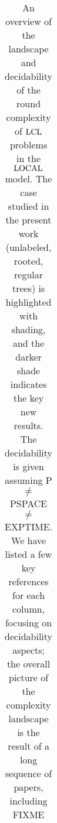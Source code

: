 \begin{table}
\begin{adjustbox}{center}
\begin{tabular}{@{}ll@{\hsp}c@{\hs}c@{\hs}c@{\hs}c@{\hsp}c@{\hs}c@{\hs}c@{\hs}c@{\hs}c@{\hsp}}
  \bottomrule
  \end{tabular}
  \end{adjustbox}
  \caption{An overview of the landscape and decidability of the round complexity of $\operatorname{LCL}$ problems in the $\operatorname{LOCAL}$ model. The case studied in the present work (unlabeled, rooted, regular trees) is highlighted with shading, and the darker shade indicates the key new results. The decidability is given assuming P $\ne$ PSPACE $\ne$ EXPTIME. We have listed a few key references for each column, focusing on decidability aspects; the overall picture of the complexity landscape is the result of a long sequence of papers, including FIXME}
\end{table}
  